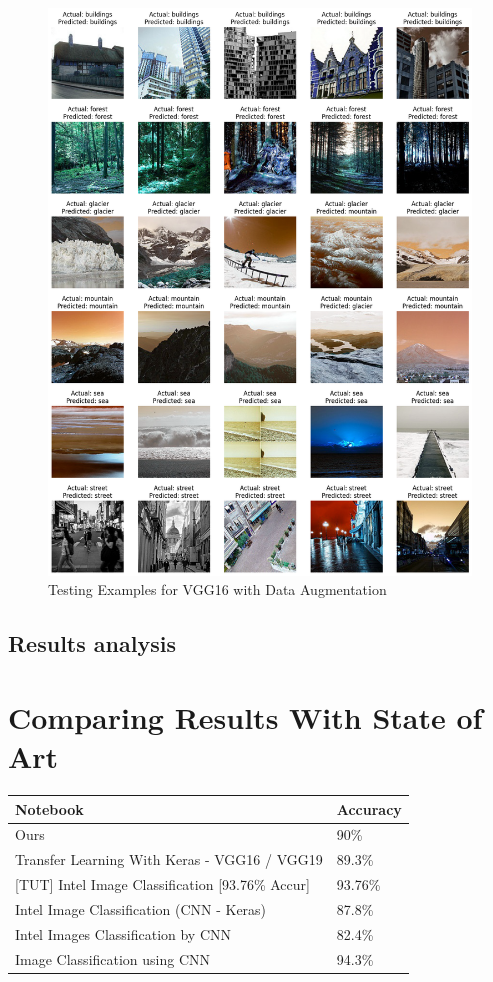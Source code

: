\documentclass[conference]{IEEEtran}
\begin{document}
\begin{figure}[H]
    \centering
    \includegraphics[width=1\linewidth]{images//VGG16/Examples_VGG16_DA.png}
    \caption{Testing Examples for VGG16 with Data Augmentation}
    \label{fig:Examples_VGG_DA}
\end{figure}

\subsection{Results analysis}

\section{Comparing Results With State of Art}

\begin{table}[h]
\centering
\begin{tabular}{|l|l|}
\hline
\textbf{Notebook} & \textbf{Accuracy} \\ \hline
Ours & 90\% \\ \hline
Transfer Learning With Keras - VGG16 / VGG19 & 89.3\% \\ \hline
[BEG][TUT] Intel Image Classification [93.76\% Accur] & 93.76\% \\ \hline
Intel Image Classification (CNN - Keras) & 87.8\% \\ \hline
Intel Images Classification by CNN & 82.4\% \\ \hline
Image Classification using CNN & 94.3\% \\ \hline
\end{tabular}
\label{table}
\end{table}
\end{document}
